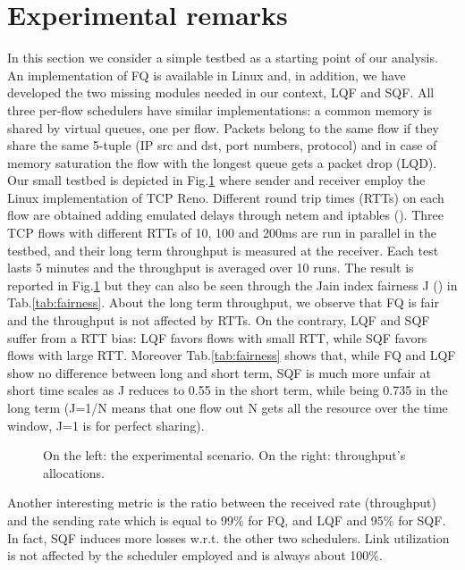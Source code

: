 \documentclass[a4paper,oneside, 11pt]{article}
\begin{document}
\section{Experimental remarks}\label{sec:exp-rem}
In this section we consider a simple testbed as a starting point of our analysis.
An implementation of FQ is available in Linux and, in addition, we have developed
the two missing modules needed in our context, LQF and SQF.
All three per-flow schedulers have similar implementations: a common memory is shared by virtual queues,
one per flow.
Packets belong to the same flow if they share the same
5-tuple (IP src and dst, port numbers, protocol) and in case of memory
saturation the flow with the longest queue gets a packet drop (LQD).
Our small testbed is depicted in Fig.\ref{fig:graph-test} where sender and receiver
employ the Linux implementation of TCP Reno. Different round trip times (RTTs) on each flow are obtained adding
emulated delays through netem and iptables (\hspace{-0.2mm}\cite{lartc}).
Three TCP flows with different RTTs  of 10, 100 and 200ms are run in parallel in the testbed,
and their long term throughput is measured at the receiver. Each test lasts 5 minutes and
the throughput is averaged over 10 runs. The result is reported in Fig.\ref{fig:graph-test}
but they can also be seen through the Jain index fairness J (\hspace{-0.2mm}\cite{jain})
in Tab.\ref{tab:fairness}.
About the long term throughput, we observe that
FQ is fair and the throughput is not affected by RTTs. On the contrary, LQF and SQF
suffer from a RTT bias: LQF favors flows with small RTT, while SQF favors flows with large RTT.
Moreover Tab.\ref{tab:fairness} shows that, while FQ and LQF show no difference between long and short term,
SQF is much more unfair at short time scales as J reduces to 0.55 in the short term, while being  0.735 in the long term
(J=1/N means that one flow out N gets all the resource over the
time window, J=1 is for perfect sharing).
\begin{figure}[htbp]
\centering

\caption{On the left: the experimental scenario. On the right: throughput's allocations.}
\label{fig:graph-test}
\end{figure}
Another interesting metric is the ratio between the received rate (throughput) and
the sending rate  which is equal to 99\% for FQ,
and  LQF and 95\% for SQF. In fact, SQF induces more losses w.r.t. the other two schedulers.
Link utilization is not affected by the scheduler employed and is always about 100\%.
\end{document}
